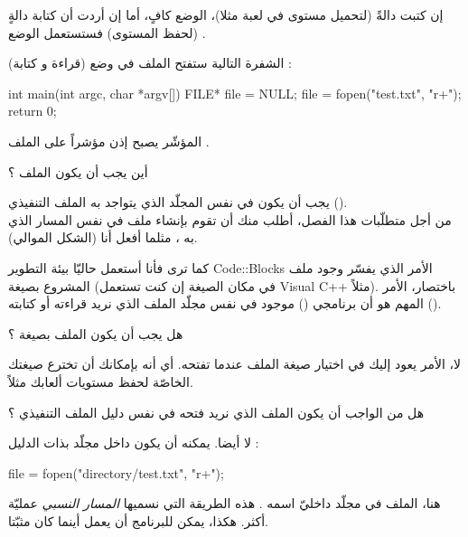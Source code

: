 إن كتبت دالةً
(لتحميل مستوى في لعبة مثلا)، الوضع
كافٍ، أما إن أردت أن كتابة دالةٍ
(لحفظ المستوى) فستستعمل الوضع
.

الشفرة التالية ستفتح الملف
في وضع
(قراءة و كتابة) :

\begin{Csource}
int main(int argc, char *argv[])
{
	FILE* file = NULL;
	file = fopen("test.txt", "r+");
	return 0;
}
\end{Csource}

المؤشّر
يصبح إذن مؤشراً على الملف
.

\begin{question}
  أين يجب أن يكون الملف
؟
\end{question}

يجب أن يكون في نفس المجلّد الذي يتواجد به الملف التنفيذي
().\\
من أجل متطلّبات هذا الفصل، أطلب منك أن تقوم بإنشاء ملف
في نفس المسار الذي به
،
مثلما أفعل أنا (الشكل الموالي).


كما ترى فأنا أستعمل  حاليّا بيئة التطوير
\textenglish{Code::Blocks}
الأمر الذي يفسّر وجود ملف المشروع بصيغة
(في مكان الصيغة
إن كنت تستعمل
\textenglish{Visual C++}
مثلاً). باختصار، الأمر المهم هو أن برنامجي
()
موجود في نفس مجلّد الملف الذي نريد قراءته أو كتابته
().

\begin{question}
  هل يجب أن يكون الملف بصيغة
 ؟
\end{question}

لا، الأمر يعود إليك في اختيار صيغة الملف عندما تفتحه. أي أنه بإمكانك أن تخترع صيغتك الخاصّة
لحفظ مستويات ألعابك مثلاً.

\begin{question}
  هل من الواجب أن يكون الملف الذي نريد فتحه في نفس دليل الملف التنفيذي ؟
\end{question}

لا أيضا. يمكنه أن يكون داخل مجلّد بذات الدليل :

\begin{Csource}
file = fopen("directory/test.txt", "r+");
\end{Csource}

هنا، الملف
في مجلّد  داخليّ اسمه
.
هذه الطريقة التي نسميها
\textit{المسار النسبي}
عمليّة أكثر. هكذا، يمكن للبرنامج أن يعمل أينما كان مثبّتا.

